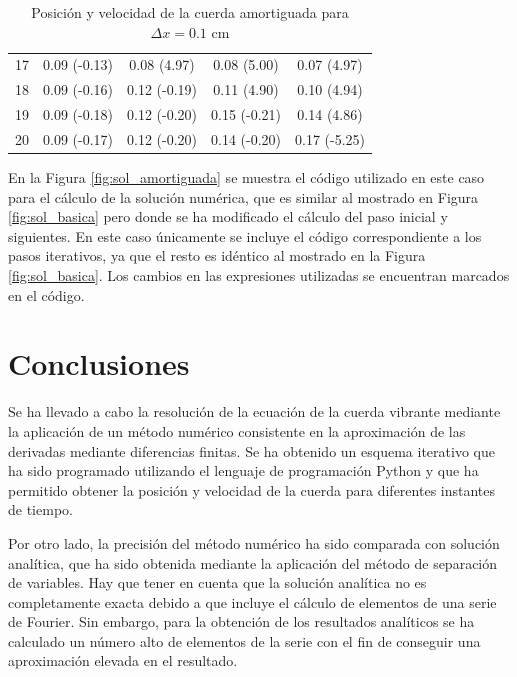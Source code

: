 \documentclass[11pt]{article}
\begin{document}
\begin{table}
\begin{small}
\begin{tabular}{ c c c c c }
17 & 0.09 (-0.13) & 0.08 (4.97) & 0.08 (5.00) & 0.07 (4.97) \\
18 & 0.09 (-0.16) & 0.12 (-0.19) & 0.11 (4.90) & 0.10 (4.94) \\
19 & 0.09 (-0.18) & 0.12 (-0.20) & 0.15 (-0.21) & 0.14 (4.86) \\
20 & 0.09 (-0.17) & 0.12 (-0.20) & 0.14 (-0.20) & 0.17 (-5.25) \\
\end{tabular}
\end{small}
\caption{Posición y velocidad de la cuerda amortiguada para $\Delta{x} = 0.1$ cm}
\label{tab:est_velocidad_amortiguado}
\end{table}

En la Figura \ref{fig:sol_amortiguada} se muestra el código utilizado en este caso para el
cálculo de la solución numérica, que es similar al mostrado en Figura \ref{fig:sol_basica}
pero donde se ha modificado el cálculo del paso inicial y siguientes. En este caso
únicamente se incluye el código correspondiente a los pasos iterativos, ya que el resto
es idéntico al mostrado en la Figura \ref{fig:sol_basica}. Los cambios en las expresiones
utilizadas se encuentran marcados en el código.

\section{Conclusiones}
Se ha llevado a cabo la resolución de la ecuación de la cuerda vibrante mediante la
aplicación de un método numérico consistente en la aproximación de las derivadas mediante
diferencias finitas. Se ha obtenido un esquema iterativo que ha sido programado utilizando
el lenguaje de programación Python y que ha permitido obtener la posición y velocidad de
la cuerda para diferentes instantes de tiempo.

Por otro lado, la precisión del método numérico ha sido comparada con solución analítica,
que ha sido obtenida mediante la aplicación del método de separación de variables. Hay que
tener en cuenta que la solución analítica no es completamente exacta debido a que incluye
el cálculo de elementos de una serie de Fourier. Sin embargo, para la obtención de los
resultados analíticos se ha calculado un número alto de elementos de la serie con el fin
de conseguir una aproximación elevada en el resultado.
\end{document}
